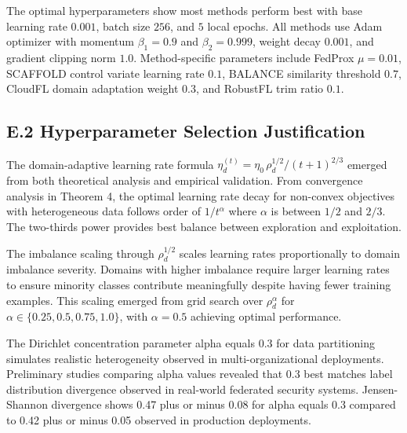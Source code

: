 \documentclass[12pt,a4paper]{article}
\theoremstyle{definition}
\begin{document}
\begingroup
\setlength{\emergencystretch}{2em}

The optimal hyperparameters show most methods perform best with base learning rate \(0.001\), batch size \(256\), and \(5\) local epochs. All methods use Adam optimizer with momentum \(\beta_{1}=0.9\) and \(\beta_{2}=0.999\), weight decay \(0.001\), and gradient clipping norm \(1.0\). Method-specific parameters include FedProx \(\mu=0.01\), SCAFFOLD control variate learning rate \(0.1\), BALANCE similarity threshold \(0.7\), CloudFL domain adaptation weight \(0.3\), and RobustFL trim ratio \(0.1\).

\par\endgroup


\subsection{E.2 Hyperparameter Selection Justification}

\begingroup
\setlength{\emergencystretch}{2em}

The domain-adaptive learning rate formula \(\eta_d^{(t)}=\eta_0\,\rho_d^{1/2}/(t+1)^{2/3}\) emerged from both theoretical analysis and empirical validation. From convergence analysis in Theorem 4, the optimal learning rate decay for non-convex objectives with heterogeneous data follows order of \(1/t^{\alpha}\) where \(\alpha\) is between \(1/2\) and \(2/3\). The two-thirds power provides best balance between exploration and exploitation.

The imbalance scaling through \(\rho_d^{1/2}\) scales learning rates proportionally to domain imbalance severity. Domains with higher imbalance require larger learning rates to ensure minority classes contribute meaningfully despite having fewer training examples. This scaling emerged from grid search over \(\rho_d^{\alpha}\) for \(\alpha \in \{0.25,0.5,0.75,1.0\}\), with \(\alpha = 0.5\) achieving optimal performance.

\par\endgroup


The Dirichlet concentration parameter alpha equals 0.3 for data partitioning simulates realistic heterogeneity observed in multi-organizational deployments. Preliminary studies comparing alpha values revealed that 0.3 best matches label distribution divergence observed in real-world federated security systems. Jensen-Shannon divergence shows 0.47 plus or minus 0.08 for alpha equals 0.3 compared to 0.42 plus or minus 0.05 observed in production deployments.
\end{document}
